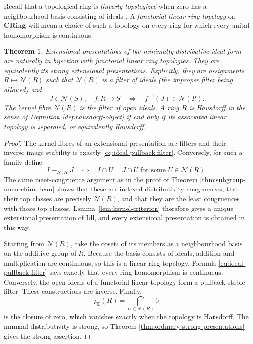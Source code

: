 \documentclass[12pt,oneside,reqno]{amsart}
\newtheorem{theorem}{Theorem}[section]
\theoremstyle{definition}
\theoremstyle{remark}
\newcommand{\Idl}{\mathrm{Idl}}
\newcommand{\CRing}{\mathbf{CRing}}
\begin{document}
Recall that a topological ring is \emph{linearly topologized} when zero
has a neighbourhood basis consisting of ideals
\cite[Tag~07E8]{StacksProject}.  A \emph{functorial linear ring
topology} on \(\CRing\) will mean a choice of such a topology on every
ring for which every unital homomorphism is continuous.

\begin{theorem}\label{thm:ideal-linear-topologies}
Extensional presentations of the minimally distributive ideal form are
naturally in bijection with functorial linear ring topologies.  They are
equivalently its strong extensional presentations.  Explicitly, they are
assignments \(R\mapsto\mathcal N(R)\) such that
\(\mathcal N(R)\) is a filter of ideals (the improper filter being
allowed) and
\begin{equation}\label{eq:ideal-pullback-filter}
 J\in\mathcal N(S),\quad f:R\longrightarrow S
 \quad\Longrightarrow\quad f^{-1}(J)\in\mathcal N(R).
\end{equation}
The kernel fibre \(\mathcal N(R)\) is the filter of open ideals.  A
ring \(R\) is Hausdorff in the sense of Definition
\ref{def:hausdorff-object} if and only if its associated linear
topology is separated, or equivalently Hausdorff.
\end{theorem}

\begin{proof}
The kernel fibres of an extensional presentation are filters and their inverse-image
stability is exactly \eqref{eq:ideal-pullback-filter}.  Conversely, for
such a family define
\begin{equation}\label{eq:ideal-local-relation}
 I\equiv_{\mathcal N,R}J
 \quad\Longleftrightarrow\quad
 I\cap U=J\cap U\text{ for some }U\in\mathcal N(R).
\end{equation}
The same meet-congruence argument as in the proof of Theorem
\ref{thm:subgroup-nonarchimedean} shows that these are indexed
distributivity congruences, that their top classes are precisely
\(\mathcal N(R)\), and that they are the least congruences with those
top classes.  Lemma~\ref{lem:kernel-criterion} therefore gives a
unique extensional presentation of \(\Idl\), and every extensional
presentation is obtained in this way.

Starting from \(\mathcal N(R)\), take the cosets of its members as a
neighbourhood basis on the additive group of \(R\).  Because the basis
consists of ideals, addition and multiplication are continuous, so this
is a linear ring topology.  Formula
\eqref{eq:ideal-pullback-filter} says exactly that every ring
homomorphism is continuous.  Conversely, the open ideals of a
functorial linear topology form a pullback-stable filter.  These
constructions are inverse.  Finally,
\[
                 \rho_{\mathbb E}(R)
                    =\bigcap_{U\in\mathcal N(R)}U
\]
is the closure of zero, which vanishes exactly when the topology is
Hausdorff.
The minimal distributivity is strong, so Theorem
\ref{thm:ordinary-strong-presentations} gives the strong assertion.
\end{proof}
\end{document}
